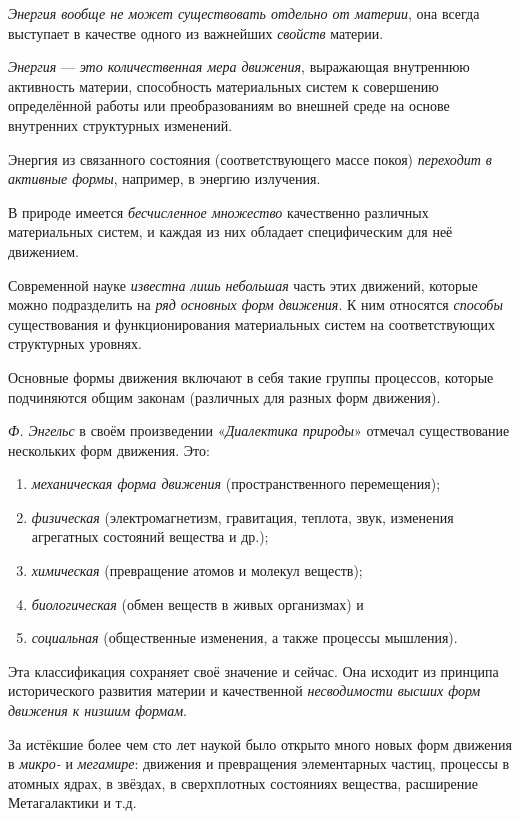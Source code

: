 \documentclass[a4paper,14pt,russian]{extreport}
\begin{document}
\emph{Энергия вообще не может существовать отдельно от материи}, она всегда выступает в качестве одного из важнейших \emph{свойств} материи.

\emph{Энергия} --- \emph{это количественная мера движения}, выражающая внутреннюю активность материи, способность материальных систем к совершению определённой работы или преобразованиям во внешней среде на основе внутренних структурных изменений.

Энергия из связанного состояния (соответствующего массе покоя) \emph{переходит в активные формы}, например, в энергию излучения.

В природе имеется \emph{бесчисленное множество} качественно различных материальных систем, и каждая из них обладает специфическим для неё движением.

Современной науке \emph{известна лишь небольшая} часть этих движений, которые можно подразделить на \emph{ряд основных форм движения}. К ним относятся \emph{способы} существования и функционирования материальных систем на соответствующих структурных уровнях.

Основные формы движения включают в себя такие группы процессов, которые подчиняются общим законам (различных для разных форм движения).

\emph{Ф. Энгельс} в своём произведении «\emph{Диалектика природы}» отмечал существование нескольких форм движения. Это:

\begin{enumerate}
\item \emph{механическая форма движения} (пространственного перемещения);
\item \emph{физическая} (электромагнетизм, гравитация, теплота, звук, изменения агрегатных состояний вещества и др.);
\item \emph{химическая} (превращение атомов и молекул веществ);
\item \emph{биологическая} (обмен веществ в живых организмах) и
\item \emph{социальная} (общественные изменения, а также процессы мышления).
\end{enumerate}

Эта классификация сохраняет своё значение и сейчас. Она исходит из принципа исторического развития материи и качественной \emph{несводимости высших форм движения к низшим формам}.

За истёкшие более чем сто лет наукой было открыто много новых форм движения в \emph{микро-} и \emph{мегамире}: движения и превращения элементарных частиц, процессы в атомных ядрах, в звёздах, в сверхплотных состояниях вещества, расширение Метагалактики и т.д.
\end{document}
